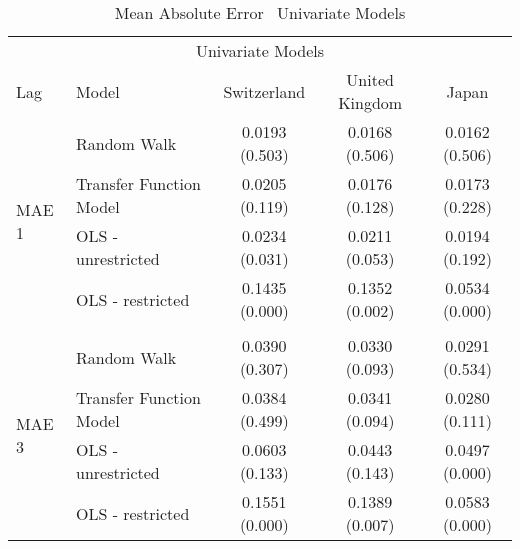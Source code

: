 \begin{table}[!h] %
  \centering
    \caption{Mean Absolute Error \textendash \ Univariate Models}
  \begin{tabular}{llccc} %
    \toprule
    \multicolumn{5}{c}{Univariate Models}                      \\
    \cmidrule(r){1-5}
    Lag                           &   Model                                     &Switzerland  & United Kingdom  & Japan\\
    \midrule
    \multirow{4}{*}{MAE 1}        & \multicolumn{1}{l}{Random Walk}             &   0.0193 (0.503) & 0.0168 (0.506) & 0.0162 (0.506)\\
                                  & \multicolumn{1}{l}{Transfer Function Model} &   0.0205 (0.119) & 0.0176 (0.128) & 0.0173 (0.228)\\ 
                                  & \multicolumn{1}{l}{OLS - unrestricted}      &   0.0234 (0.031) & 0.0211 (0.053) & 0.0194 (0.192)\\
                                  & \multicolumn{1}{l}{OLS - restricted}        &   0.1435 (0.000) & 0.1352 (0.002) & 0.0534 (0.000)\\
    \\
    \multirow{4}{*}{MAE 3}        & \multicolumn{1}{l}{Random Walk}             &   0.0390 (0.307) & 0.0330 (0.093) & 0.0291 (0.534)\\ 
                                  & \multicolumn{1}{l}{Transfer Function Model} &   0.0384 (0.499) & 0.0341 (0.094) & 0.0280 (0.111)\\
                                  & \multicolumn{1}{l}{OLS - unrestricted}      &   0.0603 (0.133) & 0.0443 (0.143) & 0.0497 (0.000)\\
                                  & \multicolumn{1}{l}{OLS - restricted}        &   0.1551 (0.000) & 0.1389 (0.007) & 0.0583 (0.000)\\
                                                                             

\end{tabular}
\end{table}
